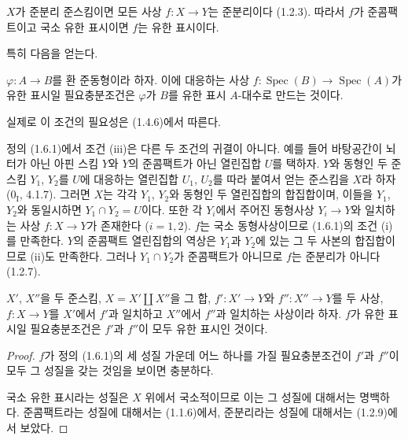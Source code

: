 $X$가 준분리 준스킴이면 모든 사상 $f:X\to Y$는 준분리이다
(1.2.3). 따라서 $f$가 준콤팩트이고 국소 유한 표시이면 $f$는 유한
표시이다.

특히 다음을 얻는다.

\begin{corollary}[1.6.3]
\label{IV.1.6.3-fr}
$\varphi:A\to B$를 환 준동형이라 하자. 이에 대응하는 사상
$f:\operatorname{Spec}(B)\to\operatorname{Spec}(A)$가 유한 표시일
필요충분조건은 $\varphi$가 $B$를 유한 표시 $A$-대수로 만드는 것이다.
\end{corollary}

실제로 이 조건의 필요성은 (1.4.6)에서 따른다.

\begin{remark}[1.6.4]
\label{IV.1.6.4-fr}
정의 (1.6.1)에서 조건 (iii)은 다른 두 조건의 귀결이 아니다. 예를
들어 바탕공간이 뇌터가 아닌 아핀 스킴 $Y$와 $Y$의 준콤팩트가 아닌
열린집합 $U$를 택하자. $Y$와 동형인 두 준스킴 $Y_1$, $Y_2$를 $U$에
대응하는 열린집합 $U_1$, $U_2$를 따라 붙여서 얻는 준스킴을 $X$라
하자 (0$_{\mathrm I}$, 4.1.7). 그러면 $X$는 각각 $Y_1$, $Y_2$와
동형인 두 열린집합의 합집합이며, 이들을 $Y_1$, $Y_2$와 동일시하면
$Y_1\cap Y_2=U$이다. 또한 각 $Y_i$에서 주어진 동형사상
$Y_i\to Y$와 일치하는 사상 $f:X\to Y$가 존재한다 ($i=1,2$).
$f$는 국소 동형사상이므로 (1.6.1)의 조건 (i)를 만족한다. $Y$의
준콤팩트 열린집합의 역상은 $Y_1$과 $Y_2$에 있는 그 두 사본의
합집합이므로 (ii)도 만족한다. 그러나 $Y_1\cap Y_2$가 준콤팩트가
아니므로 $f$는 준분리가 아니다 (1.2.7).
\end{remark}

\begin{proposition}[1.6.5]
\label{IV.1.6.5-fr}
$X'$, $X''$을 두 준스킴, $X=X'\amalg X''$을 그 합, $f':X'\to Y$와
$f'':X''\to Y$를 두 사상, $f:X\to Y$를 $X'$에서 $f'$과 일치하고
$X''$에서 $f''$과 일치하는 사상이라 하자. $f$가 유한 표시일
필요충분조건은 $f'$과 $f''$이 모두 유한 표시인 것이다.
\end{proposition}

\par\medskip\noindent
\begin{proof}
$f$가 정의 (1.6.1)의 세 성질 가운데 어느 하나를 가질 필요충분조건이
$f'$과 $f''$이 모두 그 성질을 갖는 것임을 보이면 충분하다.


국소 유한 표시라는 성질은 $X$ 위에서 국소적이므로 이는 그 성질에
대해서는 명백하다. 준콤팩트라는 성질에 대해서는 (1.1.6)에서,
준분리라는 성질에 대해서는 (1.2.9)에서 보았다.
\end{proof}

